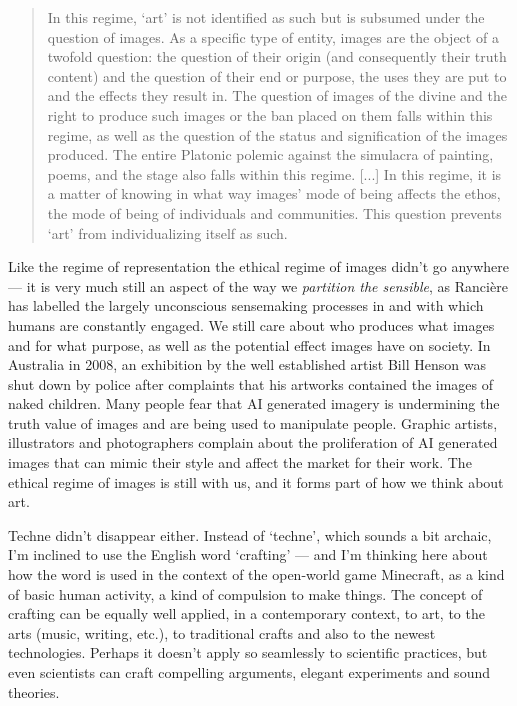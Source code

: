 \documentclass[letterpaper]{article}
\begin{document}
    \begin{quote}
        In this regime, ‘art’ is not identified as such but is subsumed under the question of images. As a specific type of entity, images are the object of a twofold question: the question of their origin (and consequently their truth content) and the question of their end or purpose, the uses they are put to and the effects they result in. The question of images of the divine and the right to produce such images or the ban placed on them falls within this regime, as well as the question of the status and signification of the images produced. The entire Platonic polemic against the simulacra of painting, poems, and the stage also falls within this regime. [...] In this regime, it is a matter of knowing in what way images' mode of being affects the ethos, the mode of being of individuals and communities. This question prevents ‘art’ from individualizing itself as such. \citep[pp.20-21]{RancierPltcsOfThAsthtcs2004}
    \end{quote}

    Like the regime of representation the ethical regime of images didn't go anywhere — it is very much still an aspect of the way we \emph{partition the sensible}, as Rancière has labelled the largely unconscious sensemaking processes in and with which humans are constantly engaged. We still care about who produces what images and for what purpose, as well as the potential effect images have on society. In Australia in 2008, an exhibition by the well established artist Bill Henson was shut down by police after complaints that his artworks contained the images of naked children. Many people fear that AI generated imagery is undermining the truth value of images and are being used to manipulate people. Graphic artists, illustrators and photographers complain about the proliferation of AI generated images that can mimic their style and affect the market for their work. The ethical regime of images is still with us, and it forms part of how we think about art. 

    Techne didn't disappear either. Instead of ‘techne’, which sounds a bit archaic, I'm inclined to use the English word ‘crafting’ — and I'm thinking here about how the word is used in the context of the open-world game Minecraft, as a kind of basic human activity, a kind of compulsion to make things. The concept of crafting can be equally well applied, in a contemporary context, to art, to the arts (music, writing, etc.), to traditional crafts and also to the newest technologies. Perhaps it doesn't apply so seamlessly to scientific practices, but even scientists can craft compelling arguments, elegant experiments and sound theories.
\end{document}
